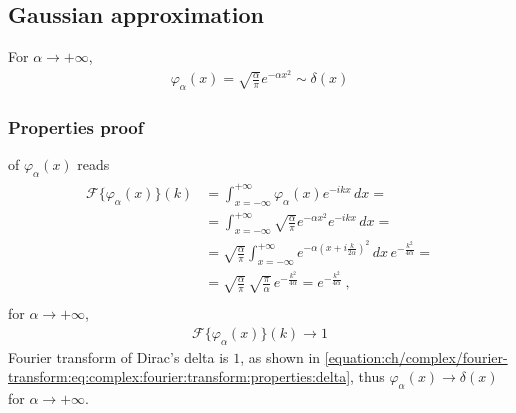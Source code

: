 \documentclass[letterpaper,10pt,english]{jupyterBook}
\begin{document}
\subsection{Gaussian approximation}
\label{\detokenize{ch/functional-analysis/dirac-delta:gaussian-approximation}}\label{\detokenize{ch/functional-analysis/dirac-delta:functional-analysis-dirac-delta-approximations-gaussian}}
\sphinxAtStartPar
For \(\alpha \rightarrow +\infty\),
\begin{equation*}
\begin{split}\varphi_{\alpha}(x) = \sqrt{\frac{\alpha}{\pi}}e^{-\alpha x^2} \sim \delta(x)\end{split}
\end{equation*}\subsubsection*{Properties \sphinxhyphen{} proof}

\sphinxAtStartPar
{\hyperref[\detokenize{ch/complex/fourier-transforms:complex-fourier-transform}]{}} of \(\varphi_{\alpha}(x)\) reads
\begin{equation*}
\begin{split}\begin{aligned}
 \mathscr{F}\{ \varphi_{\alpha}(x) \}(k)
 & = \int_{x=-\infty}^{+\infty} \varphi_\alpha(x) e^{-ikx} \, dx = \\
 & = \int_{x=-\infty}^{+\infty} \sqrt{\frac{\alpha}{\pi}} e^{-\alpha x^2} e^{-ikx} \, dx = \\
 & = \sqrt{\frac{\alpha}{\pi}} \int_{x=-\infty}^{+\infty} e^{-\alpha \left( x + i \frac{k}{2 \alpha} \right)^2} \, dx \, e^{-\frac{k^2}{4 \alpha}} = \\
 & = \sqrt{\frac{\alpha}{\pi}} \, \sqrt{\frac{\pi}{\alpha}} \, e^{-\frac{k^2}{4 \alpha}} =  e^{-\frac{k^2}{4 \alpha}} \ ,\\
\end{aligned}\end{split}
\end{equation*}
\sphinxAtStartPar
for \(\alpha \rightarrow +\infty\),
\begin{equation*}
\begin{split}\mathscr{F}\{ \varphi_{\alpha}(x) \}(k) \rightarrow 1\end{split}
\end{equation*}
\sphinxAtStartPar
Fourier transform of Dirac’s delta is \(1\), as shown in \eqref{equation:ch/complex/fourier-transform:eq:complex:fourier:transform:properties:delta}, thus \(\varphi_\alpha(x) \rightarrow \delta(x)\) for \(\alpha \rightarrow +\infty\).
\end{document}
